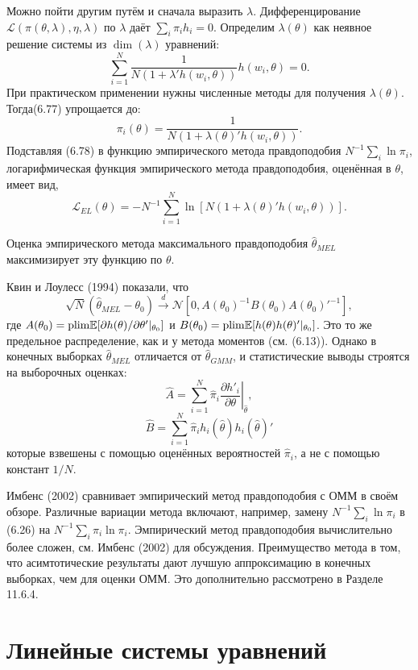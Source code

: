 Можно пойти другим путём и сначала выразить $\lambda$. Дифференцирование $\mathcal{L}(\pi(\theta,\lambda),\eta,\lambda)$ по $\lambda$ даёт $\sum_i \pi_i h_i = 0$. Определим $\lambda(\theta)$ как неявное решение системы из $\dim(\lambda)$ уравнений:
\[
\sum_{i=1}^{N} \frac{1}{N(1+\lambda'h(w_i,\theta))} h(w_i,\theta) =0.
\]
При практическом применении нужны численные методы для получения $\lambda(\theta)$. Тогда(6.77) упрощается до:
\begin{equation}
\pi_i(\theta)=\frac{1}{N(1+\lambda(\theta)' h(w_i,\theta))}.
\end{equation} 
Подставляя (6.78) в функцию эмпирического метода правдоподобия $N^{-1} \sum_i \ln \pi_i$, логарифмическая функция эмпирического метода правдоподобия, оценённая в $\theta$, имеет вид,
\[
\mathcal{L}_{EL}(\theta)=-N^{-1} \sum_{i=1}^N \ln [N(1+\lambda(\theta)' h(w_i,\theta))].
\]

Оценка эмпирического метода максимального правдоподобия $\hat{\theta}_{MEL}$ максимизирует эту функцию по $\theta$.

Квин и Лоулесс (1994) показали, что
\[
\sqrt{N} (\hat{\theta}_{MEL}-\theta_0) \xrightarrow{d} \mathcal{N}[0, A(\theta_0)^{-1} B(\theta_0) A(\theta_0)'^{-1}],
\]
где $A(\theta_0)=\mathrm{plim } \mathbb{E}[\partial h(\theta) / \partial \theta'|_{\theta_0}]$ и $B(\theta_0)= \mathrm{plim } \mathbb{E}[h(\theta)h(\theta)'|_{\theta_0}]$. Это то же предельное распределение, как и у метода моментов (см. (6.13)). Однако в конечных выборках $\hat{\theta}_{MEL}$ отличается от $\hat{\theta}_{GMM}$, и статистические выводы строятся на выборочных оценках:
\[
\hat{A}= \sum_{i=1}^N \hat{\pi}_i \left. \frac{\partial h'_i}{\partial \theta} \right|_{\hat{\theta}},
\]
\[
\hat{B}= \sum_{i=1}^N \hat{\pi}_i h_i(\hat{\theta}) h_i(\hat{\theta})'
\]
которые взвешены с помощью оценённых вероятностей $\hat{\pi}_i$, а не с помощью констант $1/N$.

Имбенс (2002) сравнивает эмпирический метод правдоподобия с ОММ в своём обзоре. Различные вариации метода включают, например, замену $N^{-1} \sum_i \ln \pi_i$ в (6.26) на $N^{-1} \sum_i \pi_i \ln \pi_i$. Эмпирический метод правдоподобия  вычислительно более сложен, см. Имбенс (2002) для обсуждения. Преимущество метода в том, что асимтотические результаты дают лучшую аппроксимацию в конечных выборках, чем для оценки ОММ. Это дополнительно рассмотрено в Разделе 11.6.4.

\section{Линейные системы уравнений}

